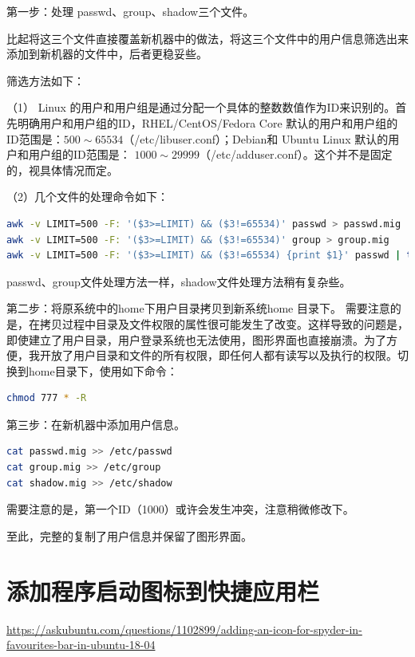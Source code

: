 {第一步：处理 passwd、group、shadow三个文件。

比起将这三个文件直接覆盖新机器中的做法，将这三个文件中的用户信息筛选出来添加到新机器的文件中，后者更稳妥些。

筛选方法如下：

（1） Linux 的用户和用户组是通过分配一个具体的整数数值作为ID来识别的。首先明确用户和用户组的ID，RHEL/CentOS/Fedora Core 默认的用户和用户组的ID范围是：$500 \sim 65534$（/etc/libuser.conf）；Debian和 Ubuntu Linux 默认的用户和用户组的ID范围是： $1000 \sim 29999$（/etc/adduser.conf）。这个并不是固定的，视具体情况而定。

（2）几个文件的处理命令如下：

 \begin{lstlisting}[language=sh]
awk -v LIMIT=500 -F: '($3>=LIMIT) && ($3!=65534)' passwd > passwd.mig
awk -v LIMIT=500 -F: '($3>=LIMIT) && ($3!=65534)' group > group.mig
awk -v LIMIT=500 -F: '($3>=LIMIT) && ($3!=65534) {print $1}' passwd | tee - |egrep -f - shadow > shadow.mig
\end{lstlisting}
passwd、group文件处理方法一样，shadow文件处理方法稍有复杂些。


第二步：将原系统中的home下用户目录拷贝到新系统home 目录下。{\color{red} 需要注意的是}，在拷贝过程中目录及文件权限的属性很可能发生了改变。这样导致的问题是，即使建立了用户目录，用户登录系统也无法使用，图形界面也直接崩溃。为了方便，我开放了用户目录和文件的所有权限，即任何人都有读写以及执行的权限。切换到home目录下，使用如下命令：
 \begin{lstlisting}[language=sh]
 chmod 777 * -R
\end{lstlisting}

第三步：在新机器中添加用户信息。
 \begin{lstlisting}[language=sh]
cat passwd.mig >> /etc/passwd
cat group.mig >> /etc/group
cat shadow.mig >> /etc/shadow
\end{lstlisting}
{\color{red}需要注意的是}，第一个ID（1000）或许会发生冲突，注意稍微修改下。

至此，完整的复制了用户信息并保留了图形界面。




\section{添加程序启动图标到快捷应用栏}


\url{https://askubuntu.com/questions/1102899/adding-an-icon-for-spyder-in-favourites-bar-in-ubuntu-18-04}



}

